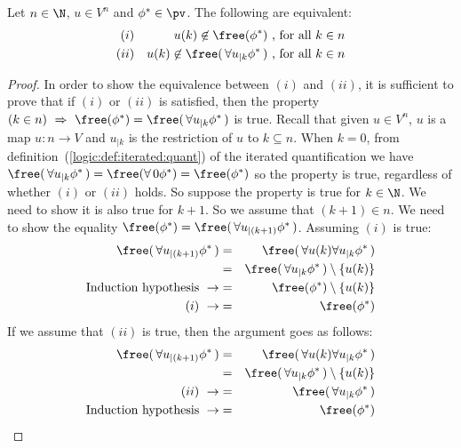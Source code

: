 \begin{lemma}\label{logic:lemma:FOPL:abscong:equivdef}
Let $n\in\N$, $u\in V^{n}$ and $\phi^{*}\in\pv$. The following are
equivalent:
    \begin{eqnarray*}
    (i)&& u(k)\not\in\free(\phi^{*})\mbox{\ ,\ for all $k\in n$}\\
    (ii)&& u(k)\not\in\free(\,\forall u_{|k}\phi^{*}\,)\mbox{\ ,\ for all $k\in n$}\\
    \end{eqnarray*}
\end{lemma}
\begin{proof}
In order to show the equivalence between $(i)$ and $(ii)$, it is
sufficient to prove that if $(i)$ or $(ii)$ is satisfied, then the
property $(k\in n)\ \Rightarrow\ \free(\phi^{*})=\free(\,\forall
u_{|k}\phi^{*}\,)$ is true. Recall that given $u\in V^{n}$, $u$ is a
map $u:n\to V$ and $u_{|k}$ is the restriction of $u$ to $k\subseteq
n$. When $k=0$, from definition~(\ref{logic:def:iterated:quant}) of
the iterated quantification we have $\free(\,\forall
u_{|k}\phi^{*}\,)=\free(\forall\,0\phi^{*})=\free(\phi^{*})$ so the
property is true, regardless of whether $(i)$ or $(ii)$ holds. So
suppose the property is true for $k\in\N$. We need to show it is
also true for $k+1$. So we assume that $(k+1)\in n$. We need to show
the equality $\free(\phi^{*})=\free(\,\forall
u_{|(k+1)}\phi^{*}\,)$. Assuming $(i)$ is true:
    \begin{eqnarray*}
    \free(\,\forall u_{|(k+1)}\phi^{*}\,)&=&\free(\,\forall u(k)\forall
    u_{|k}\phi^{*}\,)\\
    &=&\free(\,\forall
    u_{|k}\phi^{*}\,)\setminus\{u(k)\}\\
    \mbox{Induction hypothesis}\ \rightarrow
    &=&\free(\phi^{*})\setminus\{u(k)\}\\
    \mbox{$(i)$}\ \rightarrow&=&\free(\phi^{*})\\
    \end{eqnarray*}
If we assume that $(ii)$ is true, then the argument goes as follows:
    \begin{eqnarray*}
    \free(\,\forall u_{|(k+1)}\phi^{*}\,)&=&\free(\,\forall u(k)\forall
    u_{|k}\phi^{*}\,)\\
    &=&\free(\,\forall
    u_{|k}\phi^{*}\,)\setminus\{u(k)\}\\
    \mbox{$(ii)$}\ \rightarrow&=&\free(\,\forall
    u_{|k}\phi^{*}\,)\\
    \mbox{Induction hypothesis}\ \rightarrow
    &=&\free(\phi^{*})\\
    \end{eqnarray*}
\end{proof}

